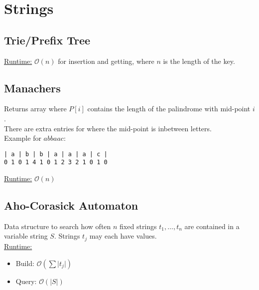 \section{Strings}
\subsection{Trie/Prefix Tree}
\underline{Runtime:} $\mathcal{O}(n)$ for insertion and getting, where
$n$ is the length of the key.
\subsection{Manachers}
Returns array where $P[i]$ contains the length of the palindrome with mid-point $i$.\\
There are extra entries for where the mid-point is inbetween letters.\\
Example for $abbaac$:
\begin{lstlisting}
| a | b | b | a | a | a | c |
0 1 0 1 4 1 0 1 2 3 2 1 0 1 0
\end{lstlisting}
\underline{Runtime:} $\mathcal{O}(n)$
\subsection{Aho-Corasick Automaton}
Data structure to search how often $n$ fixed strings $t_1, \dots, t_n$ are contained in a variable string $S$. Strings $t_j$ may each have values.\\
\underline{Runtime:}
\begin{itemize}
	\item Build: $\mathcal{O}(\sum \lvert t_j \rvert)$
	\item Query: $\mathcal{O}(\lvert S \rvert)$
\end{itemize}


